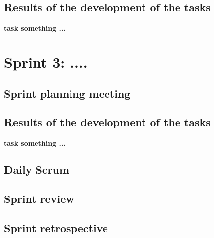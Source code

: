 
\subsection{Results of the development of the tasks}
\textbf{task something ...}


\cite{LM317,ADC,MQ7,MQ2,SenseHAT,ConfMQX}




\section{Sprint 3: ....}

\subsection{Sprint planning meeting}



\subsection{Results of the development of the tasks}
\textbf{task something ...}


\subsection{Daily Scrum}

\subsection{Sprint review}

\subsection{Sprint retrospective}

